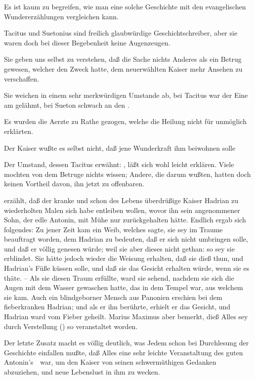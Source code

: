 \begin{aufza}
\begin{aufzb}
\end{aufzb}
\item Es ist kaum zu begreifen, wie man eine solche Geschichte mit den evangelischen Wundererzählungen vergleichen kann.
\begin{aufzb}
\item Tacitus und Suetonius sind freilich glaubwürdige Geschichtschreiber, aber sie waren doch bei dieser Begebenheit keine Augenzeugen.
\item Sie geben uns selbst zu verstehen, daß die Sache nichts Anderes als ein Betrug gewesen, welcher den Zweck hatte, dem neuerwählten Kaiser mehr Ansehen zu verschaffen.~
\item Sie weichen in einem sehr merkwürdigen Umstande ab, bei Tacitus war der Eine am  gelähmt, bei Sueton schwach an den .
\item Es wurden die Aerzte zu Rathe gezogen, welche die Heilung nicht für unmöglich erklärten.
\item Der Kaiser wußte es selbst nicht, daß jene Wunderkraft ihm beiwohnen solle \udgl\ 
\item Der Umstand, dessen Tacitus erwähnt:  \usw , läßt sich wohl leicht erklären. Viele mochten von dem Betruge nichts wissen; Andere, die darum wußten, hatten doch keinen Vortheil davon, ihn jetzt zu offenbaren.
\end{aufzb}
\end{aufza}


\begin{aufza}
\item {} erzählt, daß der kranke und schon des Lebens überdrüßige Kaiser Hadrian zu wiederholten Malen sich habe entleiben wollen, wovor ihn sein angenommener Sohn, der edle Antonin, mit Mühe nur zurückgehalten hätte. Endlich ergab sich folgendes: Zu jener Zeit kam ein Weib, welches sagte, sie sey im Traume beauftragt worden, dem Hadrian zu bedeuten, daß er sich nicht umbringen solle, und daß er völlig genesen würde; weil sie aber dieses nicht gethan: so sey sie erblindet. Sie hätte jedoch wieder die Weisung erhalten, daß sie dieß thun, und Hadrian's Füße küssen solle, und daß sie das Gesicht erhalten würde, wenn sie es thäte. -- Als sie diesen Traum erfüllte, ward sie sehend, nachdem sie sich die Augen mit dem Wasser gewaschen hatte, das in dem Tempel war, aus welchem sie kam. Auch ein blindgeborner Mensch aus Panonien erschien bei dem fieberkranken Hadrian; und als er ihn berührte, erhielt er das Gesicht, und Hadrian ward vom Fieber geheilt. Marius Maximus aber bemerkt, dieß Alles sey durch Verstellung () so veranstaltet worden.
\item Der letzte Zusatz macht es völlig deutlich, was Jedem schon bei Durchlesung der Geschichte einfallen mußte, daß Alles eine sehr leichte Veranstaltung des guten Antonin's~\RWSeitenw{272}\ war, um den Kaiser von seinen schwermüthigen Gedanken abzuziehen, und neue Lebenslust in ihm zu wecken.
\end{aufza}


